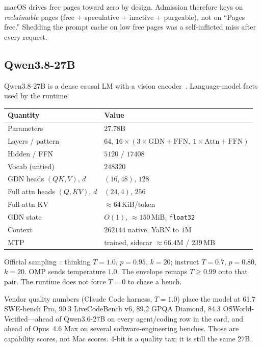 macOS drives free pages toward zero by design. Admission therefore keys on \emph{reclaimable} pages (free + speculative + inactive + purgeable), not on ``Pages free.'' Shedding the prompt cache on low free pages was a self-inflicted miss after every request.

\subsection{Qwen3.8-27B}

Qwen3.8-27B is a dense causal LM with a vision encoder~\citep{qwen38card}. Language-model facts used by the runtime:

\begin{center}
\begin{tabular}{@{}ll@{}}
\toprule
Quantity & Value \\
\midrule
Parameters & $27.78$B \\
Layers / pattern & 64, $16\times(3\times\mathrm{GDN}{+}\mathrm{FFN},\ 1\times\mathrm{Attn}{+}\mathrm{FFN})$ \\
Hidden / FFN & $5120$ / $17408$ \\
Vocab (untied) & $248320$ \\
GDN heads $(QK, V)$, $d$ & $(16, 48)$, $128$ \\
Full attn heads $(Q, KV)$, $d$ & $(24, 4)$, $256$ \\
Full-attn KV & $\approx 64$\,KiB/token \\
GDN state & $O(1)$, $\approx 150$\,MiB, \texttt{float32} \\
Context & $262144$ native, YaRN to $1$M~\citep{yarn2024} \\
MTP & trained, sidecar $\approx 66.4$M / $239$\,MB \\
\bottomrule
\end{tabular}
\end{center}

Official sampling~\citep{qwen38card}: thinking $T{=}1.0$, $p{=}0.95$, $k{=}20$; instruct $T{=}0.7$, $p{=}0.80$, $k{=}20$. OMP sends temperature $1.0$. The envelope remaps $T \ge 0.99$ onto that pair. The runtime does not force $T{=}0$ to chase a bench.

Vendor quality numbers (Claude Code harness, $T{=}1.0$) place the model at 61.7 SWE-bench Pro, 90.3 LiveCodeBench v6, 89.2 GPQA Diamond, 84.3 OSWorld-Verified---ahead of Qwen3.6-27B on every agent/coding row in the card, and ahead of Opus~4.6 Max on several software-engineering benches. Those are capability scores, not Mac scores. 4-bit is a quality tax; it is still the same 27B.


